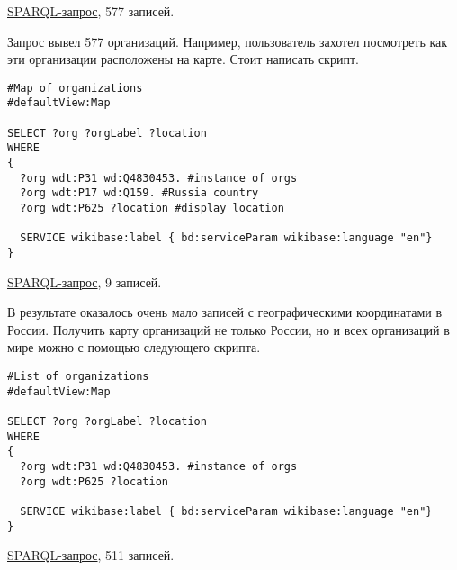 \href{https://query.wikidata.org/#%23List%20of%20organisations%20%0A%0ASELECT%20%3Forg%20%3ForgLabel%20%3Flocation%0AWHERE%0A%7B%0A%20%20%3Forg%20wdt%3AP31%20wd%3AQ4830453.%20%23instance%20of%20orgs%0A%20%20%3Forg%20wdt%3AP17%20wd%3AQ159.%20%23Russia%20country%0A%0A%20%20SERVICE%20wikibase%3Alabel%20%7B%20bd%3AserviceParam%20wikibase%3Alanguage%20%22en%22%7D%0A%7D}{SPARQL-запрос}, 577 записей.

Запрос вывел 577 организаций. Например, пользователь захотел посмотреть как эти организации расположены на карте. Стоит написать скрипт.

\begin{lstlisting}[language=SPARQL]
#Map of organizations 
#defaultView:Map

SELECT ?org ?orgLabel ?location
WHERE
{
  ?org wdt:P31 wd:Q4830453. #instance of orgs
  ?org wdt:P17 wd:Q159. #Russia country
  ?org wdt:P625 ?location #display location

  SERVICE wikibase:label { bd:serviceParam wikibase:language "en"}
}
\end{lstlisting}

\href{https://query.wikidata.org/#%23List%20of%20organisations%20%0A%23defaultView%3AMap%0A%0ASELECT%20%3Forg%20%3ForgLabel%20%3Flocation%0AWHERE%0A%7B%0A%20%20%3Forg%20wdt%3AP31%20wd%3AQ4830453.%20%23instance%20of%20orgs%0A%20%20%3Forg%20wdt%3AP17%20wd%3AQ159.%20%23Russia%20country%0A%20%20%3Forg%20wdt%3AP625%20%3Flocation%0A%0A%20%20SERVICE%20wikibase%3Alabel%20%7B%20bd%3AserviceParam%20wikibase%3Alanguage%20%22en%22%7D%0A%7D}{SPARQL-запрос}, 9 записей.

В результате оказалось очень мало записей с географическими координатами в России. Получить карту организаций не только России, но и всех организаций в мире можно с помощью следующего скрипта.

\begin{lstlisting}[language=SPARQL]
#List of organizations 
#defaultView:Map

SELECT ?org ?orgLabel ?location
WHERE
{
  ?org wdt:P31 wd:Q4830453. #instance of orgs
  ?org wdt:P625 ?location

  SERVICE wikibase:label { bd:serviceParam wikibase:language "en"}
}
\end{lstlisting}

\href{https://query.wikidata.org/#%23List%20of%20organisations%20%0A%23defaultView%3AMap%0A%0ASELECT%20%3Forg%20%3ForgLabel%20%3Flocation%0AWHERE%0A%7B%0A%20%20%3Forg%20wdt%3AP31%20wd%3AQ4830453.%20%23instance%20of%20orgs%0A%20%20%3Forg%20wdt%3AP625%20%3Flocation%0A%0A%20%20SERVICE%20wikibase%3Alabel%20%7B%20bd%3AserviceParam%20wikibase%3Alanguage%20%22en%22%7D%0A%7D}{SPARQL-запрос}, 511 записей.

